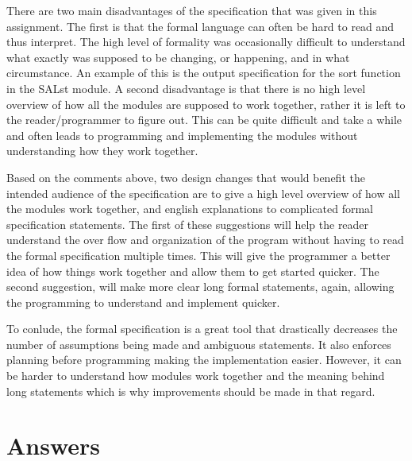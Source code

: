 \documentclass[12pt]{article}
\begin{document}
There are two main disadvantages of the specification that was given in this
assignment. The first is that the formal language can often be hard to read
and thus interpret. The high level of formality was occasionally difficult
to understand what exactly was supposed to be changing, or happening, and in
what circumstance. An example of this is the output specification for the
sort function in the SALst module. A second disadvantage is that there is no
high level overview of how all the modules are supposed to work together,
rather it is left to the reader/programmer to figure out. This can be
quite difficult and take a while and often leads to programming and implementing
the modules without understanding how they work together.

Based on the comments above, two design changes that would benefit the
intended audience of the specification are to give a high level overview
of how all the modules work together, and english explanations to complicated
formal specification statements. The first of these suggestions will help
the reader understand the over flow and organization of the program without
having to read the formal specification multiple times. This will give the
programmer a better idea of how things work together and allow them to get
started quicker. The second suggestion, will make more clear long formal
statements, again, allowing the programming to understand and implement
quicker.

To conlude, the formal specification is a great tool that drastically
decreases the number of assumptions being made and ambiguous statements.
It also enforces planning before programming making the implementation easier.
However, it can be harder to understand how modules work together and the meaning
behind long statements which is why improvements should be made in that regard.

\section{Answers}
\end{document}
